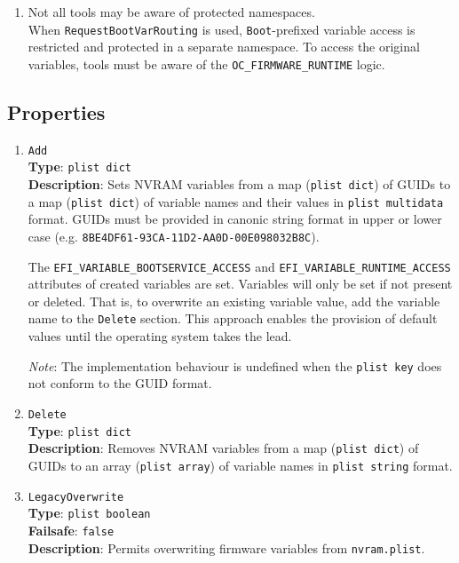 \documentclass[]{article}
\begin{document}
\begin{enumerate}
\item Not all tools may be aware of protected namespaces.\\
  When \texttt{RequestBootVarRouting} is used, \texttt{Boot}-prefixed variable access
  is restricted and protected in a separate namespace. To access the original variables,
  tools must be aware of the \texttt{OC\_FIRMWARE\_RUNTIME} logic.
\end{enumerate}

\subsection{Properties}\label{nvramprops}

\begin{enumerate}

\item
  \texttt{Add}\\
  \textbf{Type}: \texttt{plist\ dict}\\
  \textbf{Description}: Sets NVRAM variables from a map (\texttt{plist\ dict})
  of GUIDs to a map (\texttt{plist\ dict}) of variable names and their values
  in \texttt{plist\ multidata} format. GUIDs must be provided in canonic string
  format in upper or lower case (e.g. \texttt{8BE4DF61-93CA-11D2-AA0D-00E098032B8C}).

  The \texttt{EFI\_VARIABLE\_BOOTSERVICE\_ACCESS} and \texttt{EFI\_VARIABLE\_RUNTIME\_ACCESS}
  attributes of created variables are set. Variables will only be set if not present or deleted.
  That is, to overwrite an existing variable value, add the variable name to the \texttt{Delete} section.
  This approach enables the provision of default values until the operating system takes the lead.

  \emph{Note}: The implementation behaviour is undefined when the \texttt{plist\ key}
  does not conform to the GUID format.

\item
  \texttt{Delete}\\
  \textbf{Type}: \texttt{plist\ dict}\\
  \textbf{Description}: Removes NVRAM variables from a map (\texttt{plist\ dict})
  of GUIDs to an array (\texttt{plist\ array}) of variable names in
  \texttt{plist\ string} format.

\item
  \texttt{LegacyOverwrite}\\
  \textbf{Type}: \texttt{plist\ boolean}\\
  \textbf{Failsafe}: \texttt{false}\\
  \textbf{Description}: Permits overwriting firmware variables from \texttt{nvram.plist}.


\end{enumerate}
\end{document}
